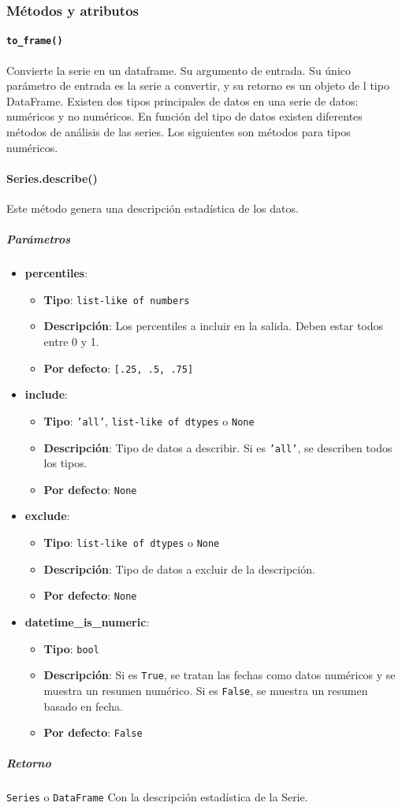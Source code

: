 \subsubsection{Métodos y atributos}
\paragraph{\texttt{to\_frame()}} Convierte la serie en un dataframe. Su argumento de entrada. Su único parámetro de entrada es la serie a convertir, y su retorno es un objeto de l tipo DataFrame.
Existen dos tipos principales de datos en una serie de datos: numéricos y no numéricos. En función del tipo de datos existen diferentes métodos de análisis de las series. Los siguientes son métodos para tipos numéricos.
\paragraph{Series.describe()} Este método genera una descripción estadística de los datos. 
\subparagraph{Parámetros}
\begin{itemize}
\item \textbf{percentiles}: 
\begin{itemize}
\item \textbf{Tipo}: \texttt{list-like of numbers}
\item \textbf{Descripción}: Los percentiles a incluir en la salida. Deben estar todos entre 0 y 1. 
\item \textbf{Por defecto}: \texttt{[.25, .5, .75]}
\end{itemize}
\item \textbf{include}:
\begin{itemize}
\item \textbf{Tipo}: \texttt{'all'}, \texttt{list-like of dtypes} o \texttt{None}
\item \textbf{Descripción}: Tipo de datos a describir. Si es \texttt{'all'}, se describen todos los tipos.
\item \textbf{Por defecto}: \texttt{None}
\end{itemize}
\item \textbf{exclude}:
\begin{itemize}
\item \textbf{Tipo}: \texttt{list-like of dtypes} o \texttt{None}
\item \textbf{Descripción}: Tipo de datos a excluir de la descripción.
\item \textbf{Por defecto}: \texttt{None}
\end{itemize}
\item \textbf{datetime\_is\_numeric}:
\begin{itemize}
\item \textbf{Tipo}: \texttt{bool}
\item \textbf{Descripción}: Si es \texttt{True}, se tratan las fechas como datos numéricos y se muestra un resumen numérico. Si es \texttt{False}, se muestra un resumen basado en fecha.
\item \textbf{Por defecto}: \texttt{False}
\end{itemize}
\end{itemize}
\subparagraph{Retorno}
\texttt{Series} o \texttt{DataFrame} 
Con la descripción estadística de la Serie.
